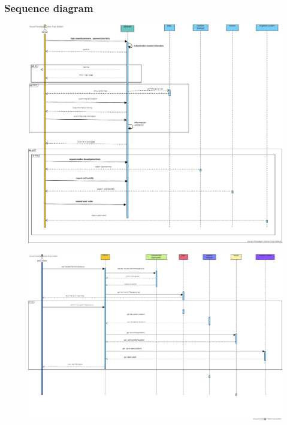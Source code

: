        \subsubsection{Sequence diagram}
    \begin{figure}[H]
\includegraphics[width=1\textwidth]{figures/firstSequenceDiagram.jpg}
\end{figure}
\begin{figure}[H]
\includegraphics[width=1\textwidth]{figures/SecondSequenceDiagram.jpg}
\end{figure}
